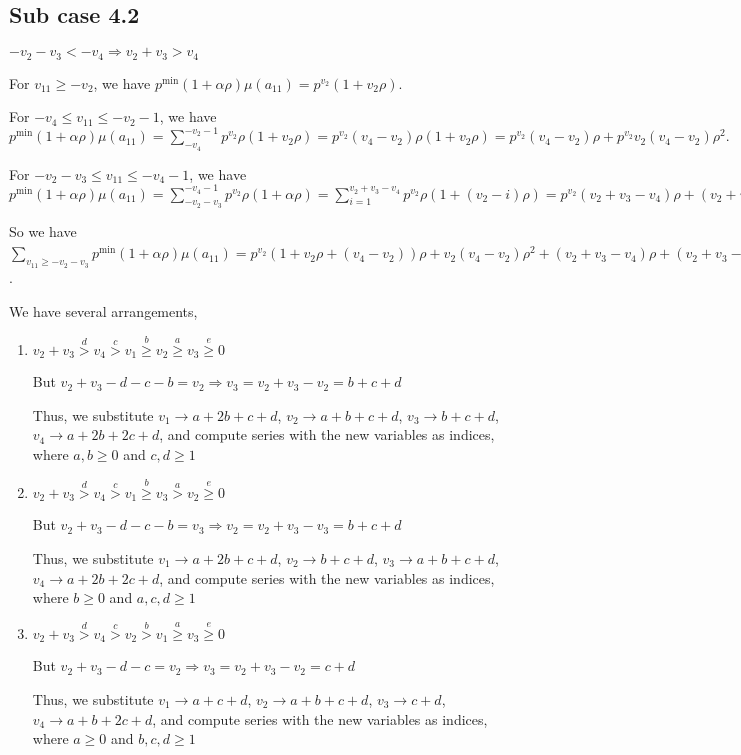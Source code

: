 \documentclass{article}
\begin{document}
\subsection{Sub case 4.2}
$-v_2-v_3<{-v_4}\Rightarrow{v_2+v_3>{v_4}}$

For $v_{11}\geq{-v_2}$, we have $p^{\min}(1+\alpha\rho)\mu(a_{11})=p^{v_2}(1+v_2\rho).$

For $-v_4\leq{v_{11}}\leq{-v_2-1}$, we have $p^{\min}(1+\alpha\rho)\mu(a_{11})=\sum_{-v_4}^{-v_2-1}p^{v_2}\rho(1+v_2\rho)=p^{v_2}(v_4-v_2)\rho(1+v_2\rho)=p^{v_2}(v_4-v_2)\rho+p^{v_2}v_2(v_4-v_2)\rho^2.$

For $-v_2-v_3\leq{v_{11}}\leq{-v_4-1}$, we have $p^{\min}(1+\alpha\rho)\mu(a_{11})=\sum_{-v_2-v_3}^{-v_4-1}p^{v_2}\rho(1+\alpha\rho)=\sum_{i=1}^{v_2+v_3-v_4}p^{v_2}\rho(1+(v_2-i)\rho)=p^{v_2}(v_2+v_3-v_4)\rho+(v_2+v_3-v_4)v_2\rho^2-\binom{v_2+v_3-v_4+1}{2}\rho^2.$

So we have $\sum_{v_{11}\geq{-v_2-v_3}}p^{\min}(1+\alpha\rho)\mu(a_{11})=p^{v_2}(1+v_2\rho+(v_4-v_2))\rho+v_2(v_4-v_2)\rho^2+(v_2+v_3-v_4)\rho+(v_2+v_3-v_4)v_2\rho^2-\frac{(v_2+v_3-v_4+1)(v_2+v_3-v_4)}{2}\rho^2)=p^{v_2}(1+v_2v_4\rho^2+v_2\rho+v_3\rho+v_3v_2\rho^2-v_4v_2\rho^2-\frac{v_2^2}{2}\rho^2-v_2v_3\rho^2+v_2v_4\rho^2-\frac{v_3^2}{2}\rho^2+v_3v_4\rho^2-\frac{v_4^2}{2}\rho^2-\frac{v_2}{2}\rho^2-\frac{v_3}{2}\rho^2+\frac{v_4}{2}\rho^2)$.

We have several arrangements,
\begin{enumerate}
\item 
$v_2+v_3\overset{d}{>}v_4\overset{c}{>}v_1\overset{b}{\geq}{v_2}\overset{a}{\geq}v_3\overset{e}{\geq}{0}$

But $v_2+v_3-d-c-b=v_2\Rightarrow{v_3=v_2+v_3-v_2=b+c+d}$

Thus, we substitute 
$v_1\rightarrow{a+2b+c+d}$, 
$v_2\rightarrow{a+b+c+d}$, 
$v_3\rightarrow{b+c+d}$, 
$v_4\rightarrow{a+2b+2c+d}$, and compute series with the new variables as indices, where $a,b\geq{0}$ and $c,d\geq{1}$

\item 
$v_2+v_3\overset{d}{>}v_4\overset{c}{>}v_1\overset{b}{\geq}{v_3}\overset{a}{>}v_2\overset{e}{\geq}{0}$

But $v_2+v_3-d-c-b=v_3\Rightarrow{v_2=v_2+v_3-v_3=b+c+d}$

Thus, we substitute 
$v_1\rightarrow{a+2b+c+d}$, 
$v_2\rightarrow{b+c+d}$, 
$v_3\rightarrow{a+b+c+d}$, 
$v_4\rightarrow{a+2b+2c+d}$, and compute series with the new variables as indices, where $b\geq{0}$ and $a,c,d\geq{1}$
\item 
$v_2+v_3\overset{d}{>}v_4\overset{c}{>}v_2\overset{b}{>}{v_1}\overset{a}{\geq}v_3\overset{e}{\geq}{0}$

But $v_2+v_3-d-c=v_2\Rightarrow{v_3=v_2+v_3-v_2=c+d}$

Thus, we substitute 
$v_1\rightarrow{a+c+d}$, 
$v_2\rightarrow{a+b+c+d}$, 
$v_3\rightarrow{c+d}$, 
$v_4\rightarrow{a+b+2c+d}$, and compute series with the new variables as indices, where $a\geq{0}$ and $b,c,d\geq{1}$

\end{enumerate}
\end{document}

